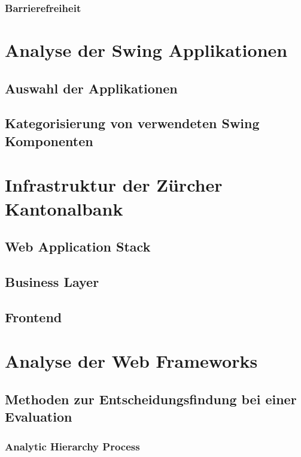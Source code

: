 \documentclass[abstracton, listof=totocnumbered,
bibliography=totocnumbered]{scrreprt}
\begin{document}
  \subsection{Barrierefreiheit}
  
  \chapter{Analyse der Swing Applikationen}
  
  \section{Auswahl der Applikationen}
  
  \section{Kategorisierung von verwendeten Swing Komponenten}
  
  \chapter{Infrastruktur der Zürcher Kantonalbank}
  
  \section{Web Application Stack}
  
  \section{Business Layer}
  
  \section{Frontend}
  
  \chapter{Analyse der Web Frameworks}
  
  \section{Methoden zur Entscheidungsfindung bei einer Evaluation}
  
  \subsection{Analytic Hierarchy Process}
  
\end{document}
